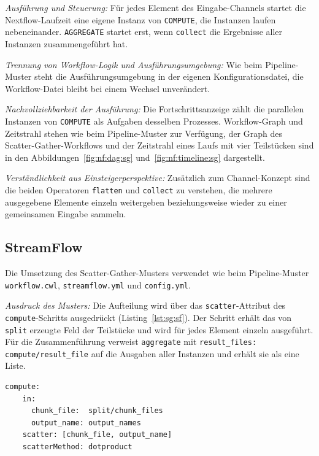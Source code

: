 \emph{Ausführung und Steuerung:} Für jedes Element des
Eingabe-Channels startet die Nextflow-Laufzeit eine eigene Instanz
von \texttt{COMPUTE}, die Instanzen laufen nebeneinander.
\texttt{AGGREGATE} startet erst, wenn \texttt{collect} die
Ergebnisse aller Instanzen zusammengeführt hat.

\emph{Trennung von Workflow-Logik und Ausführungsumgebung:} Wie beim
Pipeline-Muster steht die Ausführungsumgebung in der eigenen
Konfigurationsdatei, die Workflow-Datei bleibt bei einem Wechsel
unverändert.


\emph{Nachvollziehbarkeit der Ausführung:} Die Fortschrittsanzeige
zählt die parallelen Instanzen von \texttt{COMPUTE} als Aufgaben
desselben Prozesses. Workflow-Graph und Zeitstrahl stehen wie beim
Pipeline-Muster zur Verfügung, der Graph des
Scatter-Gather-Workflows und der Zeitstrahl eines Laufs mit vier
Teilstücken sind in den Abbildungen~\ref{fig:nf:dag:sg}
und~\ref{fig:nf:timeline:sg} dargestellt.

\emph{Verständlichkeit aus Einsteigerperspektive:} Zusätzlich zum
Channel-Konzept sind die beiden Operatoren \texttt{flatten} und
\texttt{collect} zu verstehen, die mehrere ausgegebene Elemente
einzeln weitergeben beziehungsweise wieder zu einer gemeinsamen
Eingabe sammeln.

\subsection{StreamFlow}
\label{sec:lokal:sg:streamflow}

Die Umsetzung des Scatter-Gather-Musters verwendet wie beim
Pipeline-Muster \texttt{workflow.cwl}, \texttt{streamflow.yml}
und \texttt{config.yml}.

\begin{sloppypar}
\emph{Ausdruck des Musters:} Die Aufteilung wird über das
\texttt{scatter}-Attribut des \texttt{compute}-Schritts ausgedrückt (Listing~\ref{lst:sg:sf}).
Der Schritt erhält das von \texttt{split} erzeugte Feld der
Teilstücke und wird für jedes Element einzeln ausgeführt.
Für die Zusammenführung verweist \texttt{aggregate} mit
\texttt{result\_files: compute/result\_file} auf die Ausgaben aller
Instanzen und erhält sie als eine Liste.
\end{sloppypar}

\begin{lstlisting}[caption={Fan-out über scatter am compute-Schritt (StreamFlow, Scatter-Gather)},label={lst:sg:sf}]
  compute:
    in:
      chunk_file:  split/chunk_files
      output_name: output_names
    scatter: [chunk_file, output_name]
    scatterMethod: dotproduct
\end{lstlisting}

